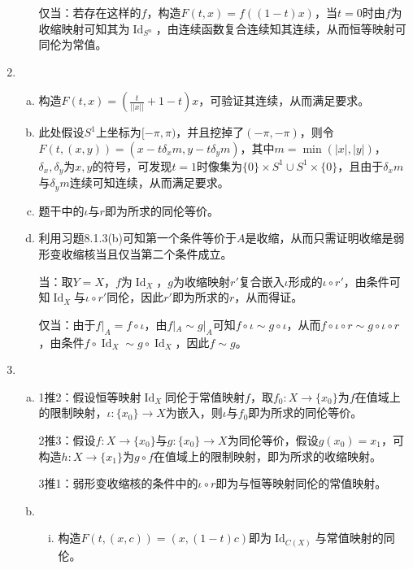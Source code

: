 \documentclass[a4paper,UTF8,fontset=windows]{ctexart}
\DeclareMathOperator{\Id}{Id}
\begin{document}
\begin{enumerate}[(1)]
\begin{enumerate}[(a)]
    仅当：若存在这样的$f$，构造$F(t,x)=f((1-t)x)$，当$t=0$时由$f$为收缩映射可知其为$\Id_{S^n}$，由连续函数复合连续知其连续，从而恒等映射可同伦为常值。
    \end{enumerate}
    
    \item
    \begin{enumerate}[(a)]
    \item
    构造$F(t,x)=(\frac{t}{||x||}+1-t)x$，可验证其连续，从而满足要求。
    
    \item
    此处假设$S^1$上坐标为$[-\pi,\pi)$，并且挖掉了$(-\pi,-\pi)$，则令$F(t,(x,y))=(x-t\delta_xm,y-t\delta_ym)$，其中$m=\min(|x|,|y|)$，$\delta_x,\delta_y$为$x,y$的符号，可发现$t=1$时像集为$\{0\}\times S^1\cup S^1\times\{0\}$，且由于$\delta_xm$与$\delta_ym$连续可知连续，从而满足要求。
    
    \item
    题干中的$\iota$与$r$即为所求的同伦等价。
    
    \item
    利用习题8.1.3(b)可知第一个条件等价于$A$是收缩，从而只需证明收缩是弱形变收缩核当且仅当第二个条件成立。
    
    当：取$Y=X$，$f$为$\Id_X$，$g$为收缩映射$r'$复合嵌入$\iota$形成的$\iota\circ r'$，由条件可知$\Id_X$与$\iota\circ r'$同伦，因此$r'$即为所求的$r$，从而得证。
    
    仅当：由于$f|_A=f\circ\iota$，由$f|_A\sim g|_A$可知$f\circ\iota\sim g\circ\iota$，从而$f\circ\iota\circ r\sim g\circ\iota\circ r$，由条件$f\circ\Id_X\sim g\circ\Id_X$，因此$f\sim g$。
    \end{enumerate}
    
    \item
    \begin{enumerate}[(a)]
    \item
    1推2：假设恒等映射$\Id_X$同伦于常值映射$f$，取$f_0:X\to\{x_0\}$为$f$在值域上的限制映射，$\iota:\{x_0\}\to X$为嵌入，则$\iota$与$f_0$即为所求的同伦等价。
    
    2推3：假设$f:X\to\{x_0\}$与$g:\{x_0\}\to X$为同伦等价，假设$g(x_0)=x_1$，可构造$h:X\to\{x_1\}$为$g\circ f$在值域上的限制映射，即为所求的收缩映射。
    
    3推1：弱形变收缩核的条件中的$\iota\circ r$即为与恒等映射同伦的常值映射。
    
    \item
    \begin{enumerate}[(i)]
    \item
    构造$F(t,(x,c))=(x,(1-t)c)$即为$\Id_{C(X)}$与常值映射的同伦。
    

\end{enumerate}
\end{enumerate}
\end{enumerate}
\end{document}
